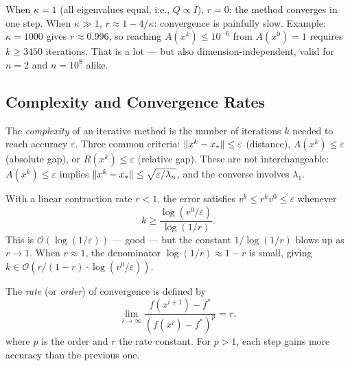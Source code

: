 When $\kappa = 1$ (all eigenvalues equal, i.e., $Q \propto I$), $r = 0$: the method converges in one step.
When $\kappa \gg 1$, $r \approx 1 - 4/\kappa$: convergence is painfully slow.
Example: $\kappa = 1000$ gives $r \approx 0.996$, so reaching $A(x^k) \leq 10^{-6}$ from $A(x^0) = 1$ requires $k \geq 3450$ iterations.
That is a lot --- but also dimension-independent, valid for $n = 2$ and $n = 10^8$ alike.


\subsection{Complexity and Convergence Rates}\label{ssec:complexity-rates}

\begin{defn}[Complexity]\label{def:complexity}
	The \textit{complexity} of an iterative method is the number of iterations $k$ needed to reach accuracy $\varepsilon$.
	Three common criteria: $\lVert x^k - x_*\rVert \leq \varepsilon$ (distance), $A(x^k) \leq \varepsilon$ (absolute gap), or $R(x^k) \leq \varepsilon$ (relative gap).
	These are not interchangeable: $A(x^k) \leq \varepsilon$ implies $\lVert x^k - x_*\rVert \leq \sqrt{\varepsilon / \lambda_n}$, and the converse involves $\lambda_1$.
\end{defn}

With a linear contraction rate $r < 1$, the error satisfies $v^k \leq r^k v^0 \leq \varepsilon$ whenever
\begin{equation}\label{eq:linear-iteration-count}
	k \geq \frac{\log(v^0 / \varepsilon)}{\log(1/r)}.
\end{equation}
This is $\mathcal{O}(\log(1/\varepsilon))$ --- good --- but the constant $1/\log(1/r)$ blows up as $r \to 1$.
When $r \approx 1$, the denominator $\log(1/r) \approx 1 - r$ is small, giving $k \in \mathcal{O}(r/(1-r) \cdot \log(v^0/\varepsilon))$.

\begin{defn}\label{def:rate-convergence}
	The \textit{rate} (or \textit{order}) of convergence is defined by
	\begin{equation}\label{eq:convergence-rate}
		\lim_{i \to \infty} \frac{f(x^{i+1}) - f^*}{(f(x^i) - f^*)^p} = r,
	\end{equation}
	where $p$ is the order and $r$ the rate constant.
	For $p > 1$, each step gains more accuracy than the previous one.
\end{defn}

